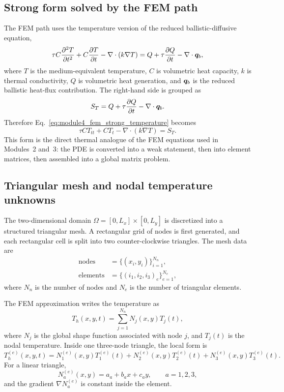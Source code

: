 \documentclass[11pt]{article}
\begin{document}
\subsection{Strong form solved by the FEM path}
The FEM path uses the temperature version of the reduced ballistic-diffusive equation,
\begin{equation}
    \tau C\pdv[2]{T}{t}+C\pdv{T}{t}
    -\nabla\cdot(k\nabla T)
    = Q+\tau\pdv{Q}{t}-\nabla\cdot\bm{q}_b,
    \label{eq:module4_fem_strong_temperature}
\end{equation}
where \(T\) is the medium-equivalent temperature, \(C\) is volumetric heat capacity, \(k\) is thermal conductivity, \(Q\) is volumetric heat generation, and \(\bm{q}_b\) is the reduced ballistic heat-flux contribution. The right-hand side is grouped as
\begin{equation}
    S_T = Q+\tau\pdv{Q}{t}-\nabla\cdot\bm{q}_b.
    \label{eq:module4_fem_source_group}
\end{equation}
Therefore Eq.~\eqref{eq:module4_fem_strong_temperature} becomes
\begin{equation}
    \tau C T_{tt}+C T_t-\nabla\cdot(k\nabla T)=S_T.
    \label{eq:module4_fem_strong_compact}
\end{equation}
This form is the direct thermal analogue of the FEM equations used in Modules~2 and~3: the PDE is converted into a weak statement, then into element matrices, then assembled into a global matrix problem.

\subsection{Triangular mesh and nodal temperature unknowns}
The two-dimensional domain \(\Omega=[0,L_x]\times[0,L_y]\) is discretized into a structured triangular mesh. A rectangular grid of nodes is first generated, and each rectangular cell is split into two counter-clockwise triangles. The mesh data are
\begin{align}
    \text{nodes} &= \{(x_i,y_i)\}_{i=1}^{N_n},\\
    \text{elements} &= \{(i_1,i_2,i_3)_e\}_{e=1}^{N_e},
\end{align}
where \(N_n\) is the number of nodes and \(N_e\) is the number of triangular elements.

The FEM approximation writes the temperature as
\begin{equation}
    T_h(x,y,t)=\sum_{j=1}^{N_n} N_j(x,y)T_j(t),
    \label{eq:module4_temperature_interpolation}
\end{equation}
where \(N_j\) is the global shape function associated with node \(j\), and \(T_j(t)\) is the nodal temperature. Inside one three-node triangle, the local form is
\begin{equation}
    T_h^{(e)}(x,y,t)=N_1^{(e)}(x,y)T_1^{(e)}(t)
    +N_2^{(e)}(x,y)T_2^{(e)}(t)
    +N_3^{(e)}(x,y)T_3^{(e)}(t).
    \label{eq:module4_local_temperature_interpolation}
\end{equation}
For a linear triangle,
\begin{equation}
    N_a^{(e)}(x,y)=a_a+b_a x+c_a y, \qquad a=1,2,3,
\end{equation}
and the gradient \(\nabla N_a^{(e)}\) is constant inside the element.
\end{document}
